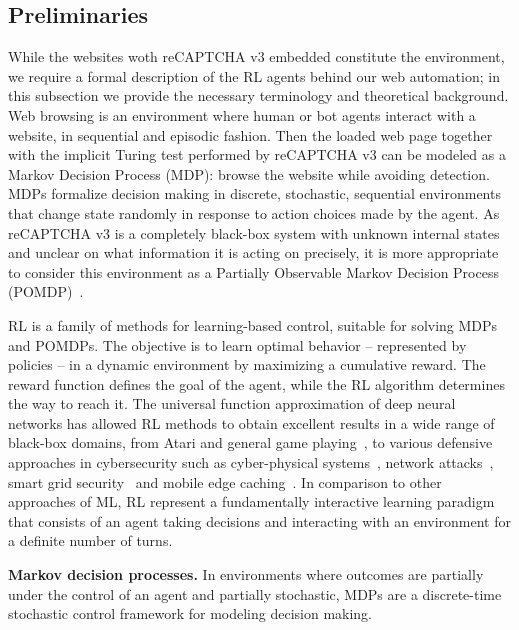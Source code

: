 \subsection{Preliminaries}

While the websites woth reCAPTCHA v3 embedded constitute the environment, we require a formal description of the \gls{RL} agents behind our web automation; in this subsection we provide the necessary terminology and theoretical background.
Web browsing is an environment where human or bot agents interact with a website, in sequential and episodic fashion.
Then the loaded web page together with the implicit Turing test performed by reCAPTCHA v3 can be modeled as a Markov Decision Process (MDP): browse the website while avoiding detection.
MDPs formalize decision making in discrete, stochastic, sequential environments that change state randomly in response to action choices made by the agent.
As reCAPTCHA v3 is a completely black-box system with unknown internal states and unclear on what information it is acting on precisely, it is more appropriate to consider this environment as a Partially Observable Markov Decision Process (POMDP)~\cite{kaelbling1998planning}.

\gls{RL} is a family of methods for learning-based control, suitable for solving MDPs and POMDPs.
The objective is to learn optimal behavior -- represented by policies -- in a dynamic environment by maximizing a cumulative reward. 
The reward function defines the goal of the agent, while the \gls{RL} algorithm determines the way to reach it.
The universal function approximation of deep neural networks has allowed \gls{RL} methods to obtain excellent results in a wide range of black-box domains, from Atari and general game playing~\cite{Mnih2013}, to various defensive approaches in cybersecurity such as cyber-physical systems~\cite{Ferdowsi2018a}, network attacks~\cite{Malialis2015}, smart grid security~\cite{Ni2019} and mobile edge caching~\cite{Xiao2018a}.
In comparison to other approaches of \gls{ML}, \gls{RL} represent a fundamentally interactive learning paradigm that consists of an agent taking decisions and interacting with an environment for a definite number of turns.

\textbf{Markov decision processes.} In environments where outcomes are partially under the control of an agent and partially stochastic, MDPs are a discrete-time stochastic control framework for modeling decision making.

